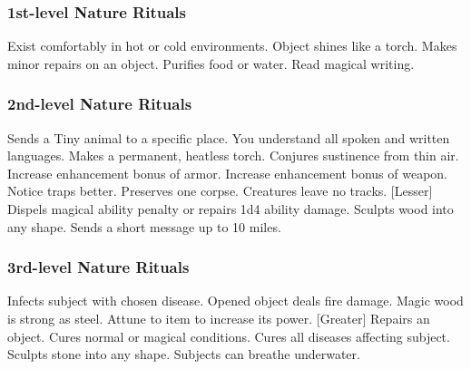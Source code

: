 \subsubsection{1st-level Nature Rituals}
\begin{rituallist}
     Exist comfortably in hot or cold environments.
     Object shines like a torch.
     Makes minor repairs on an object.
     Purifies food or water.
     Read magical writing.
\end{rituallist}

\subsubsection{2nd-level Nature Rituals}
\begin{rituallist}
     Sends a Tiny animal to a specific place.
     You understand all spoken and written languages.
     Makes a permanent, heatless torch.
     Conjures sustinence from thin air.
     Increase enhancement bonus of armor.
     Increase enhancement bonus of weapon.
     Notice traps better.
     Preserves one corpse.
     Creatures leave no tracks.
    [Lesser] Dispels magical ability penalty or repairs 1d4 ability damage.
     Sculpts wood into any shape.
     Sends a short message up to 10 miles.
\end{rituallist}

\subsubsection{3rd-level Nature Rituals}
\begin{rituallist}
     Infects subject with chosen disease.
     Opened object deals fire damage.
     Magic wood is strong as steel.
     Attune to item to increase its power.
    [Greater] Repairs an object.
     Cures normal or magical conditions.
     Cures all diseases affecting subject.
     Sculpts stone into any shape.
     Subjects can breathe underwater.
\end{rituallist}

